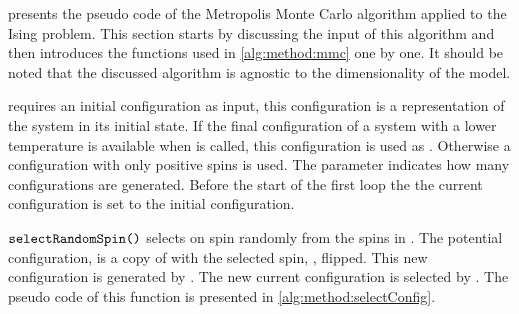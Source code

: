  presents the pseudo code of the Metropolis Monte Carlo algorithm applied to the Ising problem. This section starts by discussing the input of this algorithm and then introduces the functions used in \cref{alg:method:mmc} one by one. It should be noted that the discussed algorithm is agnostic to the dimensionality of the model.



 requires an initial configuration  as input, this configuration is a representation of the system in its initial state. If the final configuration of a system with a lower temperature is available when  is called, this configuration is used as . Otherwise a configuration with only positive spins is used. The parameter \numberOfIterations indicates how many configurations are generated. Before the start of the first loop the the current configuration is set to the initial configuration.

$\FuncSty{selectRandomSpin()}$ selects on spin randomly from the spins in . The potential configuration,  is a copy of  with the selected spin, \spin{}, flipped. This new configuration is generated by . The new current configuration is selected by . The pseudo code of this function is presented in \cref{alg:method:selectConfig}.



